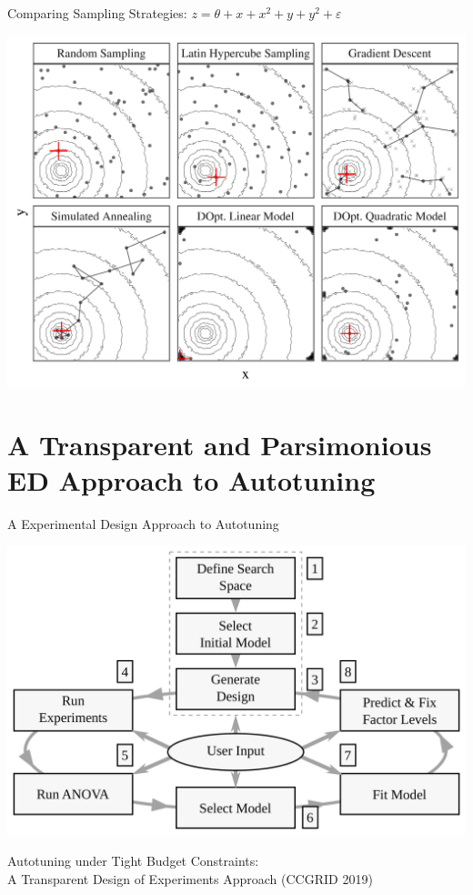 \documentclass[10pt, compress, aspectratio=169, xcolor={table,usenames,dvipsnames}]{beamer}
\begin{document}
\begin{frame}[label={sec:org657a306}]{Comparing Sampling Strategies: \(z = \theta + x + x^2 + y + y^2 + \varepsilon\)}
\begin{center}
\begin{center}
\includegraphics[width=.72\textwidth]{../../../img/sampling_comparison.pdf}
\end{center}
\end{center}
\end{frame}
\section{A Transparent and Parsimonious ED Approach to Autotuning}
\label{sec:org4859cf5}
\begin{frame}[label={sec:org201ea42}]{A Experimental Design Approach to Autotuning}
\begin{center}
\begin{center}
\includegraphics[width=.74\linewidth]{../../../img/doe_anova_strategy.pdf}
\end{center}

\vspace{-.2cm}
\end{center}

\begin{center}
\scriptsize{Autotuning under Tight Budget Constraints: \\ A Transparent Design of Experiments Approach (CCGRID 2019)}
\end{center}
\end{frame}
\end{document}
